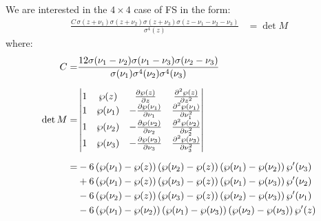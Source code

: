 \documentclass[11pt,a4paper]{article}
\numberwithin{equation}{section}
\begin{document}
We are interested in the $4\times4$ case of FS in the form:
\begin{align}
\label{eq:fs-det-m}
\frac{C\,\sigma{\left(z + {\nu}_{1}\right)} \sigma{\left(z + {\nu}_{2}\right)} \sigma{\left(z + {\nu}_{3}\right)} \sigma{\left(z - {\nu}_{1} - {\nu}_{2} - {\nu}_{3}\right)}}{\sigma^{4}{\left(z\right)}} & = \det M
\end{align}
where:
\begin{align}
C = &\frac{12  \sigma{\left({\nu}_{1} - {\nu}_{2}\right)} \sigma{\left({\nu}_{1} - {\nu}_{3}\right)} \sigma{\left({\nu}_{2} - {\nu}_{3}\right)} }{\sigma{\left({\nu}_{1}\right)} \sigma^{4}{\left({\nu}_{2}\right)} \sigma^{4}{\left({\nu}_{3}\right)}} \\[6pt]
\det M = &
\begin{vmatrix}
1 & \wp(z) & \frac{\partial \wp(z)}{\partial z} & \frac{\partial^2 \wp(z)}{\partial z^2} \\
1 & \wp(\nu_1) & -\frac{\partial \wp(\nu_1)}{\partial \nu_1} & \frac{\partial^2 \wp(\nu_1)}{\partial \nu_1^2} \\
1 & \wp(\nu_2) & -\frac{\partial \wp(\nu_2)}{\partial \nu_2} & \frac{\partial^2 \wp(\nu_2)}{\partial \nu_2^2} \\
1 & \wp(\nu_3) & -\frac{\partial \wp(\nu_3)}{\partial \nu_3} & \frac{\partial^2 \wp(\nu_3)}{\partial \nu_3^2} \\
\end{vmatrix}  \notag \\[6pt]
= & - 6 \left(\wp{\left({\nu}_{1}\right)} - \wp{\left(z\right)}\right) \left(\wp{\left({\nu}_{2}\right)} - \wp{\left(z\right)}\right) \left(\wp{\left({\nu}_{1}\right)} - \wp{\left({\nu}_{2}\right)}\right) \wp'{\left({\nu}_{3}\right)} \notag \\
& + 6 \left(\wp{\left({\nu}_{1}\right)} - \wp{\left(z\right)}\right) \left(\wp{\left({\nu}_{3}\right)} - \wp{\left(z\right)}\right) \left(\wp{\left({\nu}_{1}\right)} - \wp{\left({\nu}_{3}\right)}\right) \wp'{\left({\nu}_{2}\right)}  \notag \\
& - 6 \left(\wp{\left({\nu}_{2}\right)} - \wp{\left(z\right)}\right) \left(\wp{\left({\nu}_{3}\right)} - \wp{\left(z\right)}\right) \left(\wp{\left({\nu}_{2}\right)} - \wp{\left({\nu}_{3}\right)}\right) \wp'{\left({\nu}_{1}\right)}  \notag \\
& - 6 \left(\wp{\left({\nu}_{1}\right)} - \wp{\left({\nu}_{2}\right)}\right) \left(\wp{\left({\nu}_{1}\right)} - \wp{\left({\nu}_{3}\right)}\right) \left(\wp{\left({\nu}_{2}\right)} - \wp{\left({\nu}_{3}\right)}\right) \wp'{\left(z\right)}
\end{align}
\end{document}
